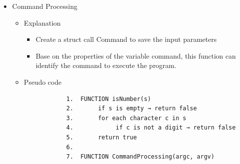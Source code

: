 \begin{itemize}
\begin{itemize}
\begin{verbatim}
            21.      time = end - start
            22.      return (comparisons, time, Tmp)
            23.
            24. FUNCTION ReadFile(A, command)
            25.      open input file
            26.      if fail → print error, stop
            27.
            28.      read n
            29.      for i = 0 to n-1: read A[i]
            30.      close file
            31.
            32. FUNCTION MakeInput(A, command)
            33.      if "-rand" → A = GenerateData(n, "-rand")
            34.      if "-sorted" → A = GenerateData(n, "-sorted")
            35.      if "-rev" → A = GenerateData(n, "-rev")
            36.      if "-nsorted" → A = GenerateData(n, "-nsorted")
            37.
            38. FUNCTION Process(command)
            39.      if inputOrder == "-all" → return
            40.
            41.      declare A
            42.
            43.      if input file exists
            44.           ReadFile(A, command)
            45.      else
            46.           MakeInput(A, command)
            47.           write A to input file
            48.
            49.      (cmp1, time1, sorted1) = GetAlgorithm(algorithm1, A)
            50.
            51.      if mode == "-c"
            52.           (cmp2, time2, sorted2) = GetAlgorithm(algorithm2, A)
            53.
            54.      save results to command
            55.
            56.      if mode == "-a" and not command3
            57.           write sorted1 to output file
        \end{verbatim}
    \end{itemize}
    \item Command Processing
    \begin{itemize}
        \item Explanation
        \begin{itemize}
            \item Create a struct call Command to save the input parameters
            \item Base on the properties of the variable command, this function can identify the command to execute the program.
        \end{itemize}
        \item Pseudo code
        \begin{verbatim}
            1.  FUNCTION isNumber(s)
            2.       if s is empty → return false
            3.       for each character c in s
            4.            if c is not a digit → return false
            5.       return true
            6.
            7.  FUNCTION CommandProcessing(argc, argv)

\end{verbatim}
\end{itemize}
\end{itemize}
